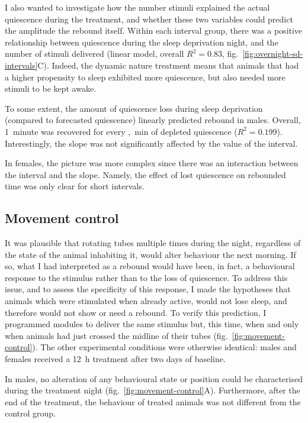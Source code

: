 I also wanted to investigate how the number stimuli explained the actual quiescence during the treatment, and whether these two variables could predict the amplitude the rebound itself.
Within each interval group, there was a positive relationship between quiescence during the sleep deprivation night, and the number of stimuli delivered
(linear model,
overall $R^2 = 0.83$, fig.~\ref{fig:overnight-sd-intervals}C).
Indeed, the dynamic nature treatment means that animals that had a higher propensity to sleep exhibited more quiescence, but also needed more stimuli to be kept awake.

To some extent, the amount of quiescence loss during sleep deprivation (compared to forecasted quiescence) linearly predicted rebound in males.
Overall, 1~minute was recovered for every ,~min of depleted quiescence ($R^2 = 0.199$).
Interestingly, the slope was not significantly affected by the value of the interval.

In females, the picture was more complex since there was an interaction between the interval and the slope.
Namely, the effect of lost quiescence on rebounded time was only clear for short intervals.



\subsection{Movement control}

It was plausible that rotating tubes multiple times during the night, regardless of the state of the animal inhabiting it, would alter behaviour the next morning.
If so, what I had interpreted as a rebound would have been, in fact, a behavioural response to the stimulus rather than to the loss of quiescence.
To address this issue, and to assess the specificity of this response, I made the hypotheses that animals which were stimulated when already active,
would not lose sleep, and therefore would not show or need a rebound.
To verify this prediction, I programmed modules to deliver the same stimulus but, this time,
when and only when animals had just crossed the midline of their tubes (fig.~\ref{fig:movement-control}).
The other experimental conditions were otherwise identical: males and females received a 12~h treatment after two days of baseline.



In males, no alteration of any behavioural state or position could be characterised during the treatment night (fig.~\ref{fig:movement-control}A).
Furthermore, after the end of the treatment, the behaviour of treated animals was not different from the control group.

